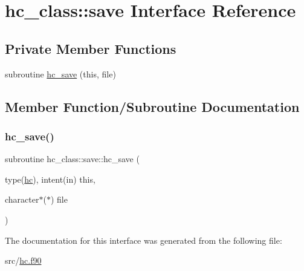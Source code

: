 \hypertarget{interfacehc__class_1_1save}{}\section{hc\+\_\+class\+:\+:save Interface Reference}
\label{interfacehc__class_1_1save}
\subsection*{Private Member Functions}
\begin{DoxyCompactItemize}
\item 
subroutine \hyperlink{interfacehc__class_1_1save_a6941b00ee0565cb1c3be5c6d1dc2a47b}{hc\+\_\+save} (this, file)
\end{DoxyCompactItemize}


\subsection{Member Function/\+Subroutine Documentation}
\mbox{\label{interfacehc__class_1_1save_a6941b00ee0565cb1c3be5c6d1dc2a47b}} 
\subsubsection{\texorpdfstring{hc\+\_\+save()}{hc\_save()}}
{\footnotesize\ttfamily subroutine hc\+\_\+class\+::save\+::hc\+\_\+save (\begin{DoxyParamCaption}\item[{type(\hyperlink{structhc__class_1_1hc}{hc}), intent(in)}]{this,  }\item[{character$\ast$($\ast$)}]{file }\end{DoxyParamCaption})\hspace{0.3cm}{\ttfamily [private]}}



The documentation for this interface was generated from the following file\+:\begin{DoxyCompactItemize}
\item 
src/\hyperlink{hc_8f90}{hc.\+f90}\end{DoxyCompactItemize}
